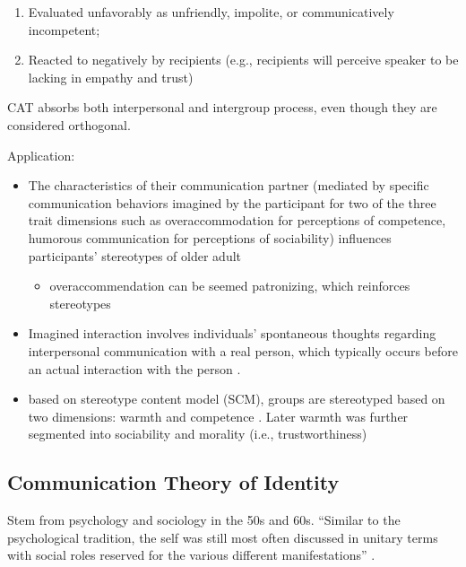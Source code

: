 \documentclass[
]{book}
\providecommand{\tightlist}{%
  \setlength{\itemsep}{0pt}\setlength{\parskip}{0pt}}
\begin{document}
\begin{enumerate}
  \begin{enumerate}
  \def\labelenumii{\arabic{enumii}.}
  \item
    Evaluated unfavorably as unfriendly, impolite, or communicatively incompetent;
  \item
    Reacted to negatively by recipients (e.g., recipients will perceive speaker to be lacking in empathy and trust)
  \end{enumerate}
\end{enumerate}

CAT absorbs both interpersonal and intergroup process, even though they are considered orthogonal.

Application:

\citep{Chen_2016}

\begin{itemize}
\item
  The characteristics of their communication partner (mediated by specific communication behaviors imagined by the
  participant for two of the three trait dimensions such as overaccommodation for perceptions of competence, humorous
  communication for perceptions of sociability) influences participants' stereotypes of older adult

  \begin{itemize}
  \tightlist
  \item
    overaccommendation can be seemed patronizing, which reinforces stereotypes
  \end{itemize}
\item
  Imagined interaction involves individuals' spontaneous thoughts regarding interpersonal communication with a real
  person, which typically occurs before an actual interaction with the person \citep{Honeycutt_2014}.
\item
  based on stereotype content model (SCM), groups are stereotyped based on two dimensions: warmth and competence
  \citep{Fiske_2007}. Later warmth was further segmented into sociability and morality (i.e., trustworthiness)
\end{itemize}

\hypertarget{communication-theory-of-identity}{%
\subsection{Communication Theory of Identity}\label{communication-theory-of-identity}}

Stem from psychology and sociology in the 50s and 60s. ``Similar to the psychological tradition, the self was still most
often discussed in unitary terms with social roles reserved for the various different manifestations'' \citep[pp.
254]{Baxter_2008}.
\end{document}
